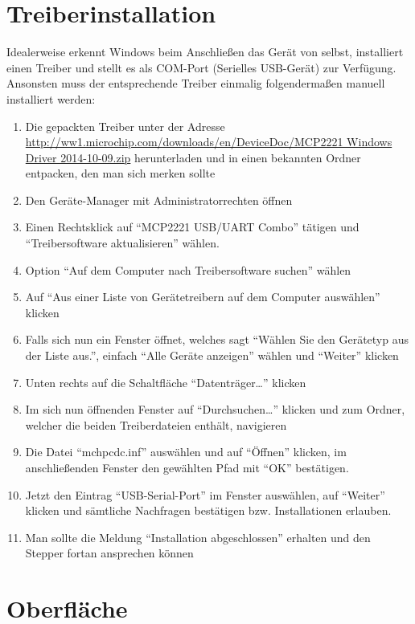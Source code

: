 \documentclass[paper=a4, open=any]{scrbook}
\begin{document}
		\section{Treiberinstallation}
			Idealerweise erkennt Windows beim Anschließen das Gerät von selbst, installiert einen Treiber und stellt es als COM-Port (Serielles USB-Gerät) zur Verfügung. Ansonsten muss der entsprechende Treiber einmalig folgendermaßen manuell installiert werden:
			\begin{enumerate}
				\item Die gepackten Treiber unter der Adresse \url{http://ww1.microchip.com/downloads/en/DeviceDoc/MCP2221 Windows Driver 2014-10-09.zip} herunterladen und in einen bekannten Ordner entpacken, den man sich merken sollte
				\item Den Geräte-Manager mit Administratorrechten öffnen
				\item Einen Rechtsklick auf \enquote{MCP2221 USB/UART Combo} tätigen und \enquote{Treibersoftware aktualisieren} wählen.
				\item Option \enquote{Auf dem Computer nach Treibersoftware suchen} wählen
				\item Auf \enquote{Aus einer Liste von Gerätetreibern auf dem Computer auswählen} klicken
				\item Falls sich nun ein Fenster öffnet, welches sagt \enquote{Wählen Sie den Gerätetyp aus der Liste aus.}, einfach \enquote{Alle Geräte anzeigen} wählen und \enquote{Weiter} klicken
				\item Unten rechts auf die Schaltfläche \enquote{Datenträger\dots} klicken
				\item Im sich nun öffnenden Fenster auf \enquote{Durchsuchen\dots} klicken und zum Ordner, welcher die beiden Treiberdateien enthält, navigieren
				\item Die Datei \enquote{mchpcdc.inf} auswählen und auf \enquote{Öffnen} klicken, im anschließenden Fenster den gewählten Pfad mit \enquote{OK} bestätigen.
				\item Jetzt den Eintrag \enquote{USB-Serial-Port} im Fenster auswählen, auf \enquote{Weiter} klicken und sämtliche Nachfragen bestätigen bzw. Installationen erlauben.
				\item Man sollte die Meldung \enquote{Installation abgeschlossen} erhalten und den Stepper fortan ansprechen können
			\end{enumerate}

		\section{Oberfläche}
\end{document}
